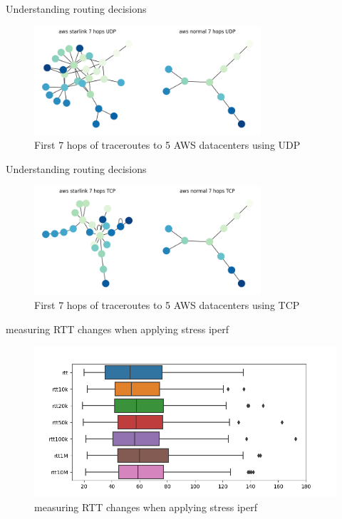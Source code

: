 \documentclass[NET,english,beameralt]{tumbeamer}
\begin{document}
\begin{frame}{Understanding routing decisions}
\begin{figure}
    \includegraphics[width=0.75\textwidth]{pics/aws_7_udp.png}
    \caption[short]{First 7 hops of traceroutes to 5 AWS datacenters using UDP}
\end{figure}
\end{frame}

\begin{frame}{Understanding routing decisions}
\begin{figure}
    \includegraphics[width=0.75\textwidth]{pics/aws_7_tcp.png}
    \caption[short]{First 7 hops of traceroutes to 5 AWS datacenters using TCP}
\end{figure}
\end{frame}

\begin{frame}{measuring RTT changes when applying stress iperf}
\begin{figure}
    \includegraphics[width=1\textwidth]{pics/rtt-iperf-stress.png}
    \caption[short]{measuring RTT changes when applying stress iperf}
\end{figure}
\end{frame}
\end{document}
